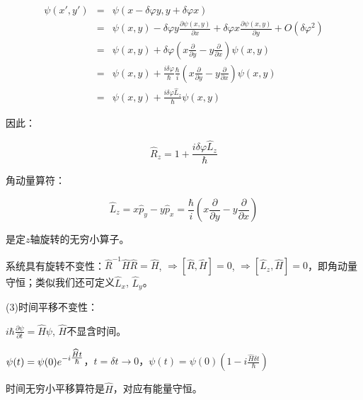 \begin{eqnarray*}
\psi \left( {x',y'} \right) & = & \psi \left( {x - \delta \varphi y,y + \delta \varphi x} \right) \\
{} &=& \psi \left( {x,y} \right) - \delta \varphi y\frac{{\partial \psi \left( {x,y} \right)}}{{\partial x}} + \delta \varphi x\frac{{\partial \psi \left( {x,y} \right)}}{{\partial y}} + O(\delta \varphi ^2 ) \\
{} & = & \psi \left( {x,y} \right) + \delta \varphi \left( {x\frac{\partial }{{\partial y}} - y\frac{\partial }{{\partial x}}} \right)\psi \left( {x,y} \right) \\
{} &= & \psi \left( {x,y} \right) + \frac{{i\delta \varphi }}{\hbar }\frac{\hbar }{i}\left( {x\frac{\partial }{{\partial y}} - y\frac{\partial }{{\partial x}}} \right)\psi \left( {x,y} \right) \\
{} & = & \psi \left( {x,y} \right) + \frac{{i\delta \varphi \widehat L_z }}{\hbar }\psi \left( {x,y} \right) 
\end{eqnarray*}

因此：

\begin{equation*}
\widehat R_z  = 1 + \frac{{i\delta \varphi \widehat L_z }}{\hbar }
\end{equation*}


角动量算符：

\begin{equation}
\widehat L_z  = x\widehat p_y  - y\widehat p_x  = \frac{\hbar }{i}\left( {x\frac{\partial }{{\partial y}} - y\frac{\partial }{{\partial x}}} \right)
\end{equation}

是定$z$轴旋转的无穷小算子。


系统具有旋转不变性：$\widehat R^{ - 1} \widehat H\widehat R = \widehat H$, $ \Rightarrow \left[ {\widehat R,\widehat H} \right] = 0$, $ \Rightarrow \left[ {\widehat L_z ,\widehat H} \right] = 0$，即角动量守恒；类似我们还可定义$\widehat L_x $, $\widehat L_y $。

(3)时间平移不变性：


$i\hbar \frac{{\partial \psi }}{{\partial t}} = \widehat H\psi $, $\hat H$不显含时间。

$\psi (t) = \psi (0)e^{ - i{\textstyle{{\widehat Ht} \over \hbar }}} $，$t = \delta t \to 0$，$\psi (t) = \psi (0)\left( {1 - i\frac{{\widehat H\delta t}}{\hbar }} \right)$

时间无穷小平移算符是$\hat H$，对应有能量守恒。
